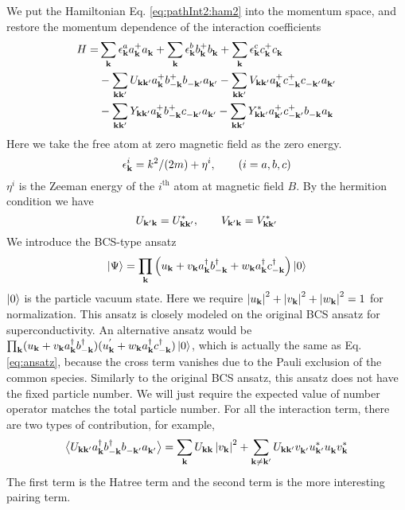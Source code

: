 We put the Hamiltonian Eq. \ref{eq:pathInt2:ham2} into the momentum space, and restore the momentum dependence of the interaction coefficients
\begin{equation}\label{eq:uvw:hamiltonian}
\begin{split}
 H=&\sum_{\mathbf{k}}\epsilon^a_{\mathbf{k}}{}a^+_{\mathbf{k}}{}a^{}_{\mathbf{k}}+\sum_{\mathbf{k}}\epsilon^b_{\mathbf{k}}{}b^+_{\mathbf{k}}{}b^{}_{\mathbf{k}}+\sum_{\mathbf{k}}\epsilon^c_{\mathbf{k}}{}c^+_{\mathbf{k}}{}c^{}_{\mathbf{k}}\\
  &-\sum_{\mathbf{k}\mathbf{k}'}U_{\mathbf{k}\mathbf{k}'}a^+_{\mathbf{k}}{}b^+_{-\mathbf{k}}{}b^{}_{-\mathbf{k}'}a^{}_{\mathbf{k}'}
	-\sum_{\mathbf{k}\mathbf{k}'}V_{\mathbf{k}\mathbf{k}'}a^+_{\mathbf{k}}{}c^+_{-\mathbf{k}}{}c^{}_{-\mathbf{k}'}a^{}_{\mathbf{k}'}\\
 &-\sum_{\mathbf{k}\mathbf{k}'}Y_{\mathbf{k}\mathbf{k}'}a^+_{\mathbf{k}}{}b^+_{-\mathbf{k}}{}c^{}_{-\mathbf{k}'}a^{}_{\mathbf{k}'}
	-\sum_{\mathbf{k}\mathbf{k}'}Y^*_{\mathbf{k}\mathbf{k}'}a^+_{\mathbf{k}'}{}c^+_{-\mathbf{k}'}{}b^{}_{-\mathbf{k}}a^{}_{\mathbf{k}}
\end{split} 
\end{equation}
Here we take the free atom at zero magnetic field as the  zero energy.  
\begin{equation*}
\epsilon_{\mathbf{k}}^i=k^2/(2m)+\eta^i, \qquad (i=a,b,c)
\end{equation*}
 $\eta^i$ is the Zeeman energy of the $i^{\text{th}}$ atom at magnetic field $B$. By the hermition condition we have 
\begin{equation}
 U_{\mathbf{k}'\mathbf{k}}=U^*_{\mathbf{k}\mathbf{k}'},\qquad{} V_{\mathbf{k}'\mathbf{k}}=V^*_{\mathbf{k}\mathbf{k}'}
\end{equation}
  We introduce the BCS-type ansatz 
\begin{equation}\label{eq:ansatz}
 \left|\Psi\right>=\prod_{\mathbf{k}}\left(u_{\mathbf{k}}+v_{\mathbf{k}}{}a^{\dagger}_{\mathbf{k}}{}b^{\dagger}_{-\mathbf{k}}+w_{\mathbf{k}}{}a^{\dagger}_{\mathbf{k}}{}c^{\dagger}_{-\mathbf{k}}\right)\left|0\right>
\end{equation}
$\left|0\right>$ is the particle vacuum state.  Here we require $\left\lvert{u_{\ensuremath{\mathbf{k}}}}\right\rvert^2+\left\lvert{v_{\ensuremath{\mathbf{k}}}}\right\rvert^2+\left\lvert{w_{\ensuremath{\mathbf{k}}}}\right\rvert^2=1$ for normalization.  This ansatz is closely modeled on the original BCS ansatz for superconductivity.  An alternative ansatz would be $\prod_{\mathbf{k}}(u_{\mathbf{k}}+v_{\mathbf{k}}{}a^{\dagger}_{\mathbf{k}}{}b^{\dagger}_{-\mathbf{k}})(u^{'}_{\mathbf{k}}+w_{\mathbf{k}}{}a^{\dagger}_{\mathbf{k}}{}c^{\dagger}_{-\mathbf{k}})\left|0\right>$, which is actually the same as Eq. \ref{eq:ansatz}, because  the cross term vanishes due to the Pauli exclusion of the common species.   Similarly to the original BCS ansatz, this ansatz does not have the fixed particle number.  We  will just require the expected value of number operator matches the total particle number. For all the interaction term, there are two types of contribution,
for example, 
\begin{equation*}
\bigl<{U_{\mathbf{k}\mathbf{k}'}a^{\dagger}_{\mathbf{k}}{}b^{\dagger}_{-\mathbf{k}}{}b^{}_{-\mathbf{k}'}a^{}_{\mathbf{k}'}}\bigr>
=\sum_{\mathbf{k}}U_{\mathbf{k}\mathbf{k}}\left\lvert{v_{\ensuremath{\mathbf{k}}}}\right\rvert^2+\sum_{\mathbf{k}\neq\mathbf{k}'}U_{\mathbf{k}\mathbf{k}'}v^{}_{\mathbf{k}'}u^*_{\mathbf{k}'}u^{}_{\mathbf{k}}{}v^*_{\mathbf{k}}
\end{equation*}
The first term is the Hatree term and the second term is the more interesting pairing term.  



